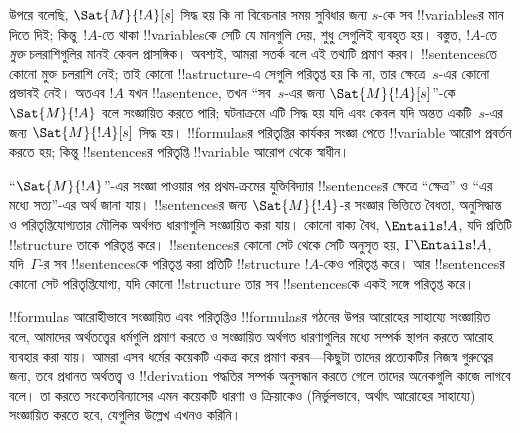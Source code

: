 \documentclass[../../../include/open-logic-section]{subfiles}
\begin{document}


উপরে বলেছি, $\Sat{M}{!A}[s]$ সিদ্ধ হয় কি না বিবেচনার সময় সুবিধার জন্য
$s$-কে সব !!{variable}sর মান দিতে দিই; কিন্তু~$!A$-তে থাকা
!!{variable}sকে সেটি যে মানগুলি দেয়, শুধু সেগুলিই ব্যবহৃত হয়। বস্তুত,
$!A$-তে \emph{মুক্ত} চলরাশিগুলির মানই কেবল প্রাসঙ্গিক। অবশ্যই, আমরা
সতর্ক বলে এই তথ্যটি প্রমাণ করব। !!{sentence}sতে কোনো মুক্ত চলরাশি নেই;
তাই কোনো !!a{structure}-এ সেগুলি পরিতৃপ্ত হয় কি না, তার ক্ষেত্রে~$s$-এর
কোনো প্রভাবই নেই। অতএব $!A$ যখন !!a{sentence}, তখন “সব~$s$-এর জন্য
$\Sat{M}{!A}[s]$”-কে $\Sat{M}{!A}$ বলে সংজ্ঞায়িত করতে পারি; ঘটনাক্রমে
এটি সিদ্ধ হয় যদি এবং কেবল যদি অন্তত একটি~$s$-এর জন্য
$\Sat{M}{!A}[s]$ সিদ্ধ হয়। !!{formula}sর পরিতৃপ্তির কার্যকর সংজ্ঞা
পেতে !!{variable} আরোপ প্রবর্তন করতে হয়; কিন্তু !!{sentence}sর
পরিতৃপ্তি !!{variable} আরোপ থেকে স্বাধীন।

“$\Sat{M}{!A}$”-এর সংজ্ঞা পাওয়ার পর প্রথম-ক্রমের যুক্তিবিদ্যার
!!{sentence}sর ক্ষেত্রে “ক্ষেত্র” ও “এর মধ্যে সত্য”-এর অর্থ জানা যায়।
!!{sentence}sর জন্য $\Sat{M}{!A}$-র সংজ্ঞার ভিত্তিতে বৈধতা, অনুসিদ্ধান্ত
ও পরিতৃপ্তিযোগ্যতার মৌলিক অর্থগত ধারণাগুলি সংজ্ঞায়িত করা যায়। কোনো
বাক্য বৈধ, $\Entails !A$, যদি প্রতিটি !!{structure} তাকে পরিতৃপ্ত করে।
!!{sentence}sর কোনো সেট থেকে সেটি অনুসৃত হয়, $\Gamma \Entails !A$,
যদি~$\Gamma$-র সব !!{sentence}sকে পরিতৃপ্ত করা প্রতিটি !!{structure}
$!A$-কেও পরিতৃপ্ত করে। আর !!{sentence}sর কোনো সেট পরিতৃপ্তিযোগ্য, যদি
কোনো !!{structure} তার সব !!{sentence}sকে একই সঙ্গে পরিতৃপ্ত করে।

!!{formula}s আরোহীভাবে সংজ্ঞায়িত এবং পরিতৃপ্তিও !!{formula}sর গঠনের
উপর আরোহের সাহায্যে সংজ্ঞায়িত বলে, আমাদের অর্থতত্ত্বের ধর্মগুলি প্রমাণ
করতে ও সংজ্ঞায়িত অর্থগত ধারণাগুলির মধ্যে সম্পর্ক স্থাপন করতে আরোহ
ব্যবহার করা যায়। আমরা এসব ধর্মের কয়েকটি একত্র করে প্রমাণ করব—কিছুটা
তাদের প্রত্যেকটির নিজস্ব গুরুত্বের জন্য, তবে প্রধানত অর্থতত্ত্ব ও
!!{derivation} পদ্ধতির সম্পর্ক অনুসন্ধান করতে গেলে তাদের অনেকগুলি কাজে
লাগবে বলে। তা করতে সংকেতবিন্যাসের এমন কয়েকটি ধারণা ও ক্রিয়াকেও
(নির্ভুলভাবে, অর্থাৎ আরোহের সাহায্যে) সংজ্ঞায়িত করতে হবে, যেগুলির উল্লেখ
এখনও করিনি।
\end{document}
